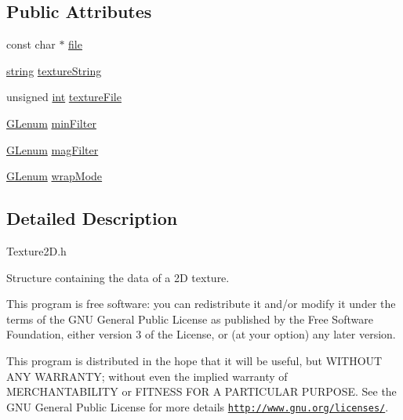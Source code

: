 \subsection*{Public Attributes}
\begin{DoxyCompactItemize}
\item 
const char $\ast$ \hyperlink{class_texture2_d_aae9361861138f81757c22940b043cf9e}{file}
\item 
\hyperlink{_g_l_e_w_2glew_8h_a06b88fc81ad0b30d1512e9609e3d7c82}{string} \hyperlink{class_texture2_d_a7e43deea5770a3bee8959cb1cce9d2b7}{texture\-String}
\item 
unsigned \hyperlink{_s_d_l__thread_8h_a6a64f9be4433e4de6e2f2f548cf3c08e}{int} \hyperlink{class_texture2_d_a671630108ecbc03195315646088d6c62}{texture\-File}
\item 
\hyperlink{_g_l_e_w_2glew_8h_a5d5233918a454ad3975c620a69ac5f0b}{G\-Lenum} \hyperlink{class_texture2_d_afc3705719e253116fbf3d58826f2a9bd}{min\-Filter}
\item 
\hyperlink{_g_l_e_w_2glew_8h_a5d5233918a454ad3975c620a69ac5f0b}{G\-Lenum} \hyperlink{class_texture2_d_a0d7a02206c0dc417044c3304d09b3418}{mag\-Filter}
\item 
\hyperlink{_g_l_e_w_2glew_8h_a5d5233918a454ad3975c620a69ac5f0b}{G\-Lenum} \hyperlink{class_texture2_d_a4ac23b61dbdfaca415c469f2b9b52d84}{wrap\-Mode}
\end{DoxyCompactItemize}


\subsection{Detailed Description}
Texture2\-D.\-h

Structure containing the data of a 2\-D texture.

This program is free software\-: you can redistribute it and/or modify it under the terms of the G\-N\-U General Public License as published by the Free Software Foundation, either version 3 of the License, or (at your option) any later version.

This program is distributed in the hope that it will be useful, but W\-I\-T\-H\-O\-U\-T A\-N\-Y W\-A\-R\-R\-A\-N\-T\-Y; without even the implied warranty of M\-E\-R\-C\-H\-A\-N\-T\-A\-B\-I\-L\-I\-T\-Y or F\-I\-T\-N\-E\-S\-S F\-O\-R A P\-A\-R\-T\-I\-C\-U\-L\-A\-R P\-U\-R\-P\-O\-S\-E. See the G\-N\-U General Public License for more details \href{http://www.gnu.org/licenses/}{\tt http\-://www.\-gnu.\-org/licenses/}. 

